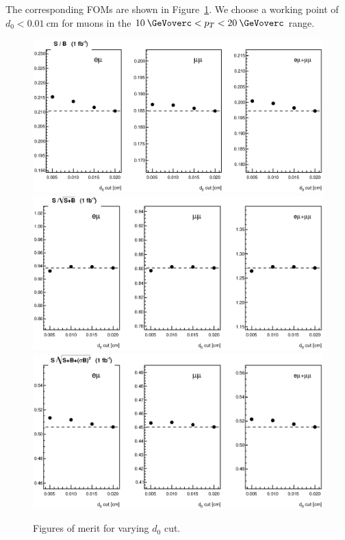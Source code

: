 The corresponding FOMs are shown in Figure~\ref{fig:ipfoms}. We choose a working point of $d_0<0.01\:$cm for muons in the $10\:\GeVoverc < p_T < 20\:\GeVoverc$ range.
\begin{figure}[!htbp]
\begin{center}
\includegraphics[scale=0.55]{figures/d0_fom1.eps}
\includegraphics[scale=0.55]{figures/d0_fom2.eps}
\includegraphics[scale=0.55]{figures/d0_fom3.eps}
\caption{Figures of merit for varying $d_0$ cut.}
\label{fig:ipfoms}
\end{center}
\end{figure}

